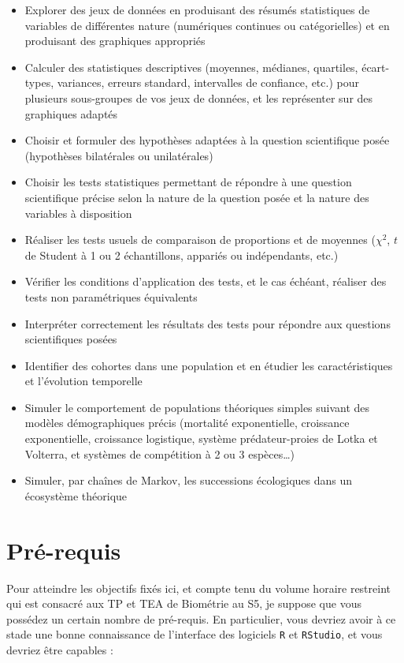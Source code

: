 \documentclass[
  a4paper,
  DIV=11,
  numbers=noendperiod,
  oneside]{scrreprt}
\providecommand{\tightlist}{%
  \setlength{\itemsep}{0pt}\setlength{\parskip}{0pt}}\usepackage{longtable,booktabs,array}
\begin{document}
\begin{itemize}
\tightlist
\item
  Explorer des jeux de données en produisant des résumés statistiques de
  variables de différentes nature (numériques continues ou
  catégorielles) et en produisant des graphiques appropriés
\item
  Calculer des statistiques descriptives (moyennes, médianes, quartiles,
  écart-types, variances, erreurs standard, intervalles de confiance,
  etc.) pour plusieurs sous-groupes de vos jeux de données, et les
  représenter sur des graphiques adaptés
\item
  Choisir et formuler des hypothèses adaptées à la question scientifique
  posée (hypothèses bilatérales ou unilatérales)
\item
  Choisir les tests statistiques permettant de répondre à une question
  scientifique précise selon la nature de la question posée et la nature
  des variables à disposition
\item
  Réaliser les tests usuels de comparaison de proportions et de moyennes
  (\(\chi^2\), \(t\) de Student à 1 ou 2 échantillons, appariés ou
  indépendants, etc.)
\item
  Vérifier les conditions d'application des tests, et le cas échéant,
  réaliser des tests non paramétriques équivalents
\item
  Interpréter correctement les résultats des tests pour répondre aux
  questions scientifiques posées
\item
  Identifier des cohortes dans une population et en étudier les
  caractéristiques et l'évolution temporelle
\item
  Simuler le comportement de populations théoriques simples suivant des
  modèles démographiques précis (mortalité exponentielle, croissance
  exponentielle, croissance logistique, système prédateur-proies de
  Lotka et Volterra, et systèmes de compétition à 2 ou 3 espèces\ldots)
\item
  Simuler, par chaînes de Markov, les successions écologiques dans un
  écosystème théorique
\end{itemize}

\hypertarget{pruxe9-requis}{%
\section*{Pré-requis}\label{pruxe9-requis}}

Pour atteindre les objectifs fixés ici, et compte tenu du volume horaire
restreint qui est consacré aux TP et TEA de Biométrie au S5, je suppose
que vous possédez un certain nombre de pré-requis. En particulier, vous
devriez avoir à ce stade une bonne connaissance de l'interface des
logiciels \texttt{R} et \texttt{RStudio}, et vous devriez être capables
:
\end{document}
